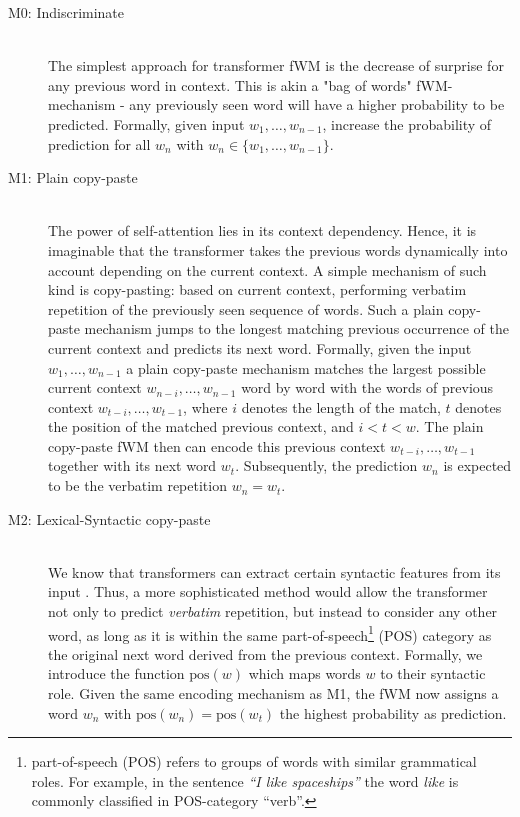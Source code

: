 \begin{description}
    \item[M0: Indiscriminate]\hfill \\
        The simplest approach for transformer fWM is the decrease of surprise for any previous word in context. This is akin a  "bag of words" fWM-mechanism - any previously seen word will have a higher probability to be predicted.
        Formally, given input $w_1, \dots, w_{n-1}$, increase the probability of prediction for all $w_n$ with $w_n \in \{w_1, \dots, w_{n-1}\}$.\\

    \item[M1: Plain copy-paste]\hfill \\
        The power of self-attention lies in its context dependency.
        Hence, it is imaginable that the transformer takes the previous words dynamically into account depending on the current context.
        A simple mechanism of such kind is copy-pasting: based on current context, performing verbatim repetition of the previously seen sequence of words.
        Such a plain copy-paste mechanism jumps to the longest matching previous occurrence of the current context and predicts its next word.
        Formally, given the input $w_1, \dots, w_{n-1}$ a plain copy-paste mechanism matches the largest possible current context $w_{n-i}, \dots, w_{n-1}$ word by word with the words of previous context $w_{t-i}, \dots, w_{t-1}$, where $i$ denotes the length of the match, $t$ denotes the position of the matched previous context, and $i < t < w$.
        The plain copy-paste fWM then can encode this previous context $w_{t-i}, \dots, w_{t-1}$ together with its next word $w_t$. Subsequently, the prediction $w_n$ is expected to be the verbatim repetition $w_n = w_{t}$.\\

    \item[M2: Lexical-Syntactic copy-paste]\hfill \\
        We know that transformers can extract certain syntactic features from its input \parencite{rogers_primer_2020}.
        Thus, a more sophisticated method would allow the transformer not only to predict \textit{verbatim} repetition, but instead to consider any other word, as long as it is within the same part-of-speech\footnote{part-of-speech (POS) refers to groups of words with similar grammatical roles. For example, in the sentence \textit{``I like spaceships''} the word \textit{like} is commonly classified in POS-category ``verb''.} (POS) category as the original next word derived from the previous context.
        Formally, we introduce the function $\text{pos}(w)$ which maps words $w$ to their syntactic role.
        Given the same encoding mechanism as M1, the fWM now assigns a word $w_n$ with $\text{pos}(w_n) = \text{pos}(w_{t})$ the highest probability as prediction.\\


\end{description}
